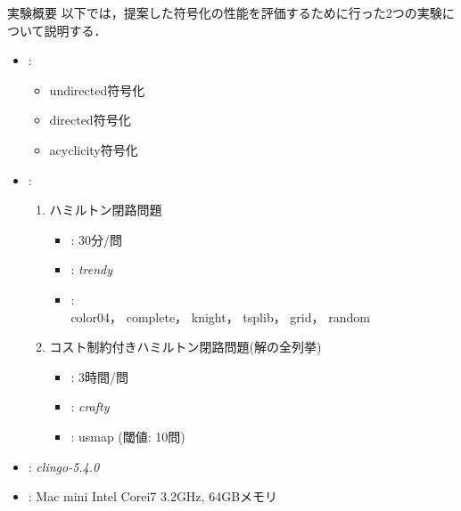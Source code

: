 \documentclass[dvipdfmx,11pt]{beamer}
\begin{document}
\begin{frame}{実験概要}
  以下では，提案した符号化の性能を評価するために行った2つの実験について説明する．
  \begin{itemize}
  \item {}:
    \begin{itemize}
    \item \textsf{undirected}符号化
    \item \textsf{directed}符号化
    \item \textsf{acyclicity}符号化
    \end{itemize}
  \item {}:
    \begin{enumerate}
    \item ハミルトン閉路問題
      \begin{itemize}
      \item {}: 30分/問
      \item {}: \textit{trendy}
      \item {}:\\
        \textsf{color04}，
        \textsf{complete}，
        \textsf{knight}，
        \textsf{tsplib}，
        \textsf{grid}，
        \textsf{random}
      \end{itemize}
    \item コスト制約付きハミルトン閉路問題(解の全列挙)
      \begin{itemize}
      \item {}: 3時間/問
      \item {}: \textit{crafty}
      \item {}: \textsf{usmap} (閾値: 10問)
      \end{itemize}
    \end{enumerate}
  \item {}: \textit{clingo-5.4.0}
  \item {}: Mac mini Intel Corei7 3.2GHz, 64GBメモリ
  \end{itemize}
\end{frame}
\end{document}
